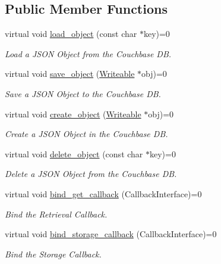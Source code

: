 \subsection*{Public Member Functions}
\begin{DoxyCompactItemize}
\item 
virtual void \hyperlink{classCouchbaseInterface_a62a765de48bfc92d748df829ca960ff2}{load\-\_\-object} (const char $\ast$key)=0
\begin{DoxyCompactList}\small\item\em Load a J\-S\-O\-N Object from the Couchbase D\-B. \end{DoxyCompactList}\item 
virtual void \hyperlink{classCouchbaseInterface_ab4ea907f469d14323e451ffdccb213c2}{save\-\_\-object} (\hyperlink{classWriteable}{Writeable} $\ast$obj)=0
\begin{DoxyCompactList}\small\item\em Save a J\-S\-O\-N Object to the Couchbase D\-B. \end{DoxyCompactList}\item 
virtual void \hyperlink{classCouchbaseInterface_a7ac9545e6f7a45d24e8e41ccae1f6112}{create\-\_\-object} (\hyperlink{classWriteable}{Writeable} $\ast$obj)=0
\begin{DoxyCompactList}\small\item\em Create a J\-S\-O\-N Object in the Couchbase D\-B. \end{DoxyCompactList}\item 
virtual void \hyperlink{classCouchbaseInterface_a99ec66952f649bb84c80b20487e82839}{delete\-\_\-object} (const char $\ast$key)=0
\begin{DoxyCompactList}\small\item\em Delete a J\-S\-O\-N Object from the Couchbase D\-B. \end{DoxyCompactList}\item 
virtual void \hyperlink{classCouchbaseInterface_a88980b99dc329e5cd02f240ddbbba1ca}{bind\-\_\-get\-\_\-callback} (Callback\-Interface)=0
\begin{DoxyCompactList}\small\item\em Bind the Retrieval Callback. \end{DoxyCompactList}\item 
virtual void \hyperlink{classCouchbaseInterface_a54a056865fc0caa456413b97c6cfb030}{bind\-\_\-storage\-\_\-callback} (Callback\-Interface)=0
\begin{DoxyCompactList}\small\item\em Bind the Storage Callback. \end{DoxyCompactList}\item 

\end{DoxyCompactItemize}
